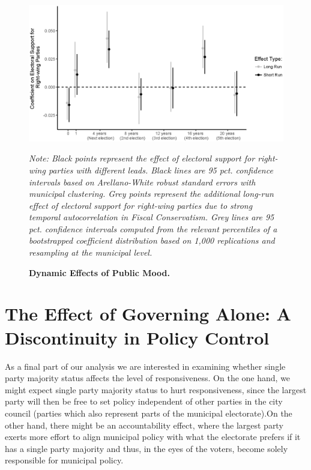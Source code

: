 \documentclass[a4paper,12pt]{article}
\newcommand\fnote[1]{\captionsetup{font=small}\caption*{#1}}
\begin{document}
\begin{figure}[h]
	\centering
	\includegraphics[scale = .8]{coef_on_varying_leads.eps}
	\caption{\textbf{Dynamic Effects of Public Mood.}} \fnote{\emph{Note: Black points represent the effect of electoral support for right-wing parties with different leads. Black lines are 95 pct. confidence intervals based on Arellano-White robust standard errors with municipal clustering. Grey points represent the additional long-run effect of electoral support for right-wing parties due to strong temporal autocorrelation in Fiscal Conservatism. Grey lines are 95 pct. confidence intervals computed from the relevant percentiles of a bootstrapped coefficient distribution based on 1,000 replications and resampling at the municipal level.}}
	\label{fig:LongRun}
\end{figure}



\section{The Effect of Governing Alone: A Discontinuity in Policy Control}

As a final part of our analysis we are interested in examining whether single party majority status affects the level of responsiveness. On the one hand, we might expect single party majority status to hurt responsiveness, since the largest party will then be free to set policy independent of other parties in the city council (parties which also represent parts of the municipal electorate).On the other hand, there might be an accountability effect, where the largest party exerts more effort to align municipal policy with what the electorate prefers if it has a single party majority and thus, in the eyes of the voters, become solely responsible for municipal policy.
\end{document}
